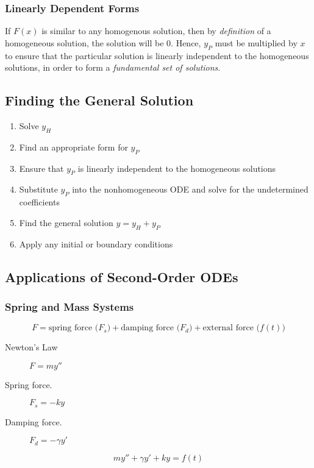 \documentclass{article}
\begin{document}
\subsubsection{Linearly Dependent Forms}
If \(F\left( x \right)\) is similar to any homogenous solution, then by
\textit{definition} of a homogeneous solution, the solution will be
\(0\). Hence, \(y_P\) must be multiplied by \(x\) to ensure that the
particular solution is linearly independent to the homogeneous
solutions, in order to form a \textit{fundamental set of solutions}.
\subsection{Finding the General Solution}
\begin{enumerate}
    \item Solve \(y_H\)
    \item Find an appropriate form for \(y_P\)
    \item Ensure that \(y_P\) is linearly independent to the
          homogeneous solutions
    \item Substitute \(y_P\) into the nonhomogeneous ODE and solve for
          the undetermined coefficients
    \item Find the general solution \(y = y_H + y_P\)
    \item Apply any initial or boundary conditions
\end{enumerate}
\subsection{Applications of Second-Order ODEs}
\subsubsection{Spring and Mass Systems}
\begin{equation*}
    F = \text{spring force (\(F_s\))} + \text{damping force (\(F_d\))} + \text{external force (\(f\left( t \right)\))}
\end{equation*}
\begin{description}
    \item[Newton's Law] \(F = m y''\)
    \item[Spring force.] \(F_s = -k y\)
    \item[Damping force.] \(F_d = -\gamma y'\)
\end{description}
\begin{equation*}
    m y'' + \gamma y' + k y = f\left( t \right)
\end{equation*}
\end{document}
